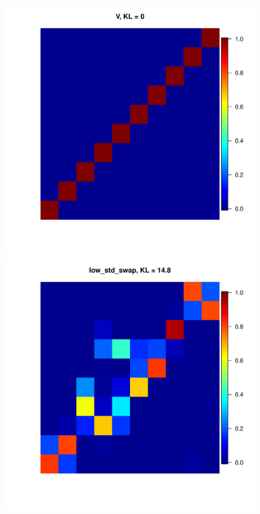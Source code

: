 \documentclass[11pt, oneside]{article}   	%
\begin{document}
\begin{figure}[h!]
\begin{minipage}[t]{.45\textwidth}
		\end{minipage}
		\hfill
		\begin{minipage}[t]{.45\textwidth}
			\centering
			\includegraphics[width=\textwidth]{figures/theorem2_2/heat_V_N2000n10alpha1run1.pdf}
			
		\end{minipage} 
		\hfill
		\begin{minipage}[t]{.45\textwidth}
			\centering
			\includegraphics[width=\textwidth]{figures/theorem2_2/heat_low_std_swap_N2000n10alpha1run1.pdf}
			

\end{minipage}
\end{figure}
\end{document}
